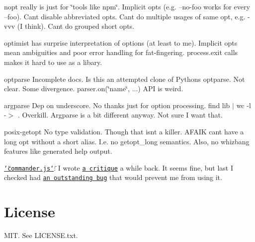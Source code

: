 \begin{DoxyItemize}
\item {\ttfamily nopt} really is just for \char`\"{}tools like npm\char`\"{}. Implicit opts (e.\+g. \textquotesingle{}--no-\/foo\textquotesingle{} works for every \textquotesingle{}--foo\textquotesingle{}). Can\textquotesingle{}t disable abbreviated opts. Can\textquotesingle{}t do multiple usages of same opt, e.\+g. \textquotesingle{}-\/vvv\textquotesingle{} (I think). Can\textquotesingle{}t do grouped short opts.
\item {\ttfamily optimist} has surprise interpretation of options (at least to me). Implicit opts mean ambiguities and poor error handling for fat-\/fingering. {\ttfamily process.\+exit} calls makes it hard to use as a libary.
\item {\ttfamily optparse} Incomplete docs. Is this an attempted clone of Python\textquotesingle{}s {\ttfamily optparse}. Not clear. Some divergence. {\ttfamily parser.\+on(\char`\"{}name\char`\"{}, ...)} A\+PI is weird.
\item {\ttfamily argparse} Dep on underscore. No thanks just for option processing. {\ttfamily find lib $\vert$ wc -\/l} -\/$>$ {}. Overkill. Argparse is a bit different anyway. Not sure I want that.
\item {\ttfamily posix-\/getopt} No type validation. Though that isn\textquotesingle{}t a killer. A\+F\+A\+IK can\textquotesingle{}t have a long opt without a short alias. I.\+e. no {\ttfamily getopt\+\_\+long} semantics. Also, no whizbang features like generated help output.
\item \href{https://github.com/visionmedia/commander.js}{\tt \char`\"{}commander.\+js\char`\"{}}\+: I wrote \href{http://trentm.com/2014/01/a-critique-of-commander-for-nodejs.html}{\tt a critique} a while back. It seems fine, but last I checked had \href{https://github.com/visionmedia/commander.js/pull/121}{\tt an outstanding bug} that would prevent me from using it.
\end{DoxyItemize}

\section*{License}

M\+IT. See L\+I\+C\+E\+N\+S\+E.\+txt. 